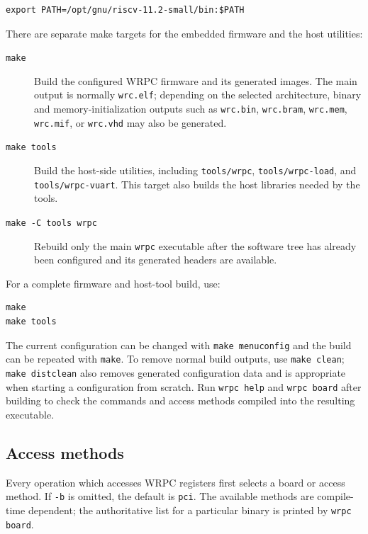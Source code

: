 \documentclass[a4paper,12pt]{article}
\begin{document}
\begin{lstlisting}
export PATH=/opt/gnu/riscv-11.2-small/bin:$PATH
\end{lstlisting}

There are separate make targets for the embedded firmware and the host
utilities:

\begin{description}
\item[\texttt{make}] Build the configured WRPC firmware and its generated
  images. The main output is normally \texttt{wrc.elf}; depending on the
  selected architecture, binary and memory-initialization outputs such as
  \texttt{wrc.bin}, \texttt{wrc.bram}, \texttt{wrc.mem}, \texttt{wrc.mif}, or
  \texttt{wrc.vhd} may also be generated.
\item[\texttt{make tools}] Build the host-side utilities, including
  \texttt{tools/wrpc}, \texttt{tools/wrpc-load}, and
  \texttt{tools/wrpc-vuart}. This target also builds the host libraries needed
  by the tools.
\item[\texttt{make -C tools wrpc}] Rebuild only the main \texttt{wrpc}
  executable after the software tree has already been configured and its
  generated headers are available.
\end{description}

For a complete firmware and host-tool build, use:

\begin{lstlisting}
make
make tools
\end{lstlisting}

The current configuration can be changed with \texttt{make menuconfig} and
the build can be repeated with \texttt{make}. To remove normal build outputs,
use \texttt{make clean}; \texttt{make distclean} also removes generated
configuration data and is appropriate when starting a configuration from
scratch. Run \texttt{wrpc help} and \texttt{wrpc board} after building to
check the commands and access methods compiled into the resulting executable.

\subsection{Access methods}

Every operation which accesses WRPC registers first selects a board or access
method. If \texttt{-b} is omitted, the default is \texttt{pci}. The available
methods are compile-time dependent; the authoritative list for a particular
binary is printed by \texttt{wrpc board}.
\end{document}

